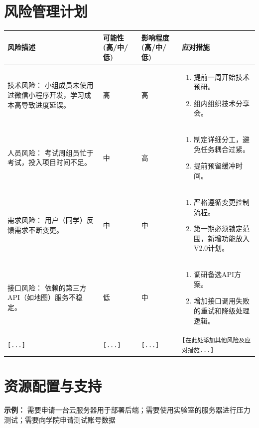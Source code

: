 \documentclass[12pt]{ctexart}
\begin{document}
\section{风险管理计划}
\begin{center}
\begin{tabular}{|p{4cm}|p{2cm}|p{2cm}|p{5cm}|}
\hline
\textbf{风险描述} & \textbf{可能性 (高/中/低)} & \textbf{影响程度 (高/中/低)} & \textbf{应对措施} \\
\hline
技术风险： 小组成员未使用过微信小程序开发，学习成本高导致进度延误。 & 高 & 高 & 
\begin{enumerate}
    \item 提前一周开始技术预研。
    \item 组内组织技术分享会。
\end{enumerate} \\
\hline
人员风险： 考试周组员忙于考试，投入项目时间不足。 & 中 & 高 & 
\begin{enumerate}
    \item 制定详细分工，避免任务耦合过紧。
    \item 提前预留缓冲时间。
\end{enumerate} \\
\hline
需求风险： 用户（同学）反馈需求不断变更。 & 中 & 中 & 
\begin{enumerate}
    \item 严格遵循变更控制流程。
    \item 第一期必须锁定范围，新增功能放入V2.0计划。
\end{enumerate} \\
\hline
接口风险： 依赖的第三方API（如地图）服务不稳定。 & 低 & 中 & 
\begin{enumerate}
    \item 调研备选API方案。
    \item 增加接口调用失败的重试和降级处理逻辑。
\end{enumerate} \\
\hline
\texttt{[...]} & \texttt{[...]} & \texttt{[...]} & \texttt{[在此处添加其他风险及应对措施...]} \\
\hline
\end{tabular}
\end{center}

\section{资源配置与支持}
\begin{tcolorbox}
\textbf{示例：} 需要申请一台云服务器用于部署后端；需要使用实验室的服务器进行压力测试；需要向学院申请测试账号数据
\end{tcolorbox}
\end{document}
